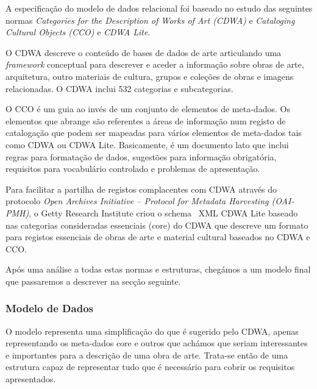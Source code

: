 \documentclass[letterpaper]{article}
\begin{document}
{
A especifica\c{c}\~ao do modelo de dados relacional foi baseado no
estudo das seguintes normas \textit{Categories for the Description of
Works of Art (CDWA)} e \textit{Cataloging Cultural Objects (CCO) }e
\textit{CDWA Lite}. \ }

{
O CDWA descreve o conte\'udo de bases de dados de arte articulando uma
\textit{framework} conceptual para descrever e aceder a
informa\c{c}\~ao sobre obras de arte, arquitetura, outro materiais de
cultura, grupos e cole\c{c}\~oes de obras e imagens relacionadas. O
CDWA inclui 532 categorias e subcategorias. }

{
O CCO \'e um guia ao inv\'es de um conjunto de elementos de meta-dados.
Os elementos que abrange s\~ao referentes a \'areas de informa\c{c}\~ao
num registo de cataloga\c{c}\~ao que podem ser mapeadas para v\'arios
elementos de meta-dados tais como CDWA ou CDWA Lite. Basicamente, \'e
um documento lato que inclui regras para formata\c{c}\~ao de dados,
sugest\~oes para informa\c{c}\~ao obrigat\'oria, requisitos para
vocabul\'ario controlado e problemas de apresenta\c{c}\~ao.}

{
Para facilitar a partilha de registos complacentes com CDWA atrav\'es do
protocolo \textit{Open Archives Initiative -- Protocol for Metadata
Harvesting (OAI-PMH)}, o Getty Research Institute criou o schema \ XML
CDWA Lite baseado nas categorias consideradas essenciais (core) do CDWA
que descreve um formato para registos essenciais de obras de arte e
material cultural baseados no CDWA e CCO.}


\bigskip

{
Ap\'os uma an\'alise a todas estas normas e estruturas, cheg\'amos a um
modelo final que passaremos a descrever na sec\c{c}\~ao seguinte.}


\bigskip


\bigskip

\subsubsection[Modelo de Dados]{ Modelo de
Dados}
{
O modelo representa uma simplifica\c{c}\~ao do que \'e sugerido pelo
CDWA, apenas representando os meta-dados core e outros que ach\'amos
que seriam interessantes e importantes para a descri\c{c}\~ao de uma
obra de arte. Trata-se ent\~ao de uma estrutura capaz de representar
tudo que \'e necess\'ario para cobrir os requisitos apresentados.}
\end{document}
